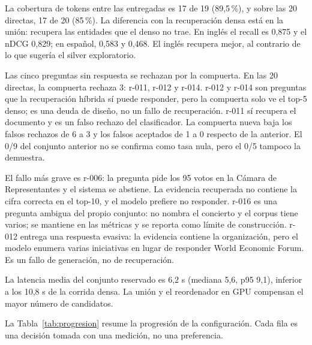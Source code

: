 La cobertura de tokens entre las entregadas es 17 de 19 (89,5\,\%), y sobre las 20 directas, 17 de 20 (85\,\%). La diferencia con la recuperaci\'on densa est\'a en la uni\'on: recupera las entidades que el denso no trae. En ingl\'es el recall es 0,875 y el nDCG 0,829; en espa\~nol, 0,583 y 0,468. El ingl\'es recupera mejor, al contrario de lo que suger\'ia el silver exploratorio.

Las cinco preguntas sin respuesta se rechazan por la compuerta. En las 20 directas, la compuerta rechaza 3: r-011, r-012 y r-014. r-012 y r-014 son preguntas que la recuperaci\'on h\'ibrida s\'i puede responder, pero la compuerta solo ve el top-5 denso; es una deuda de dise\~no, no un fallo de recuperaci\'on. r-011 s\'i recupera el documento y es un falso rechazo del clasificador. La compuerta nueva baja los falsos rechazos de 6 a 3 y los falsos aceptados de 1 a 0 respecto de la anterior. El 0/9 del conjunto anterior no se confirma como tasa nula, pero el 0/5 tampoco la demuestra.

El fallo m\'as grave es r-006: la pregunta pide los 95 votos en la C\'amara de Representantes y el sistema se abstiene. La evidencia recuperada no contiene la cifra correcta en el top-10, y el modelo prefiere no responder. r-016 es una pregunta ambigua del propio conjunto: no nombra el concierto y el corpus tiene varios; se mantiene en las m\'etricas y se reporta como l\'imite de construcci\'on. r-012 entrega una respuesta evasiva: la evidencia contiene la organizaci\'on, pero el modelo enumera varias iniciativas en lugar de responder World Economic Forum. Es un fallo de generaci\'on, no de recuperaci\'on.

La latencia media del conjunto reservado es 6,2 s (mediana 5,6, p95 9,1), inferior a los 10,8 s de la corrida densa. La uni\'on y el reordenador en GPU compensan el mayor n\'umero de candidatos.

La Tabla~\ref{tab:progresion} resume la progresi\'on de la configuraci\'on. Cada fila es una decisi\'on tomada con una medici\'on, no una preferencia.

